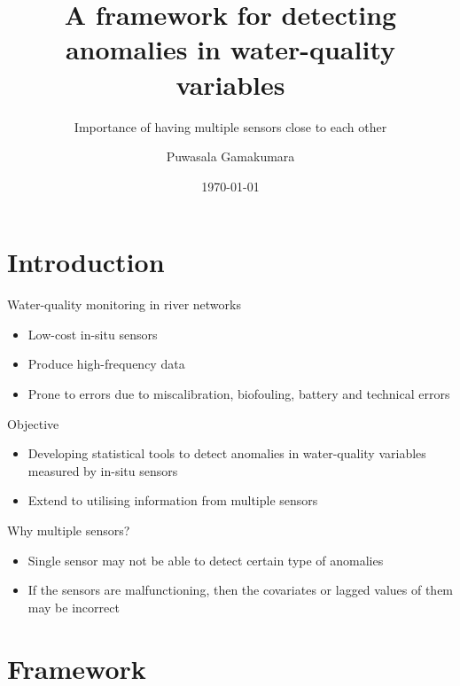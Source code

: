 \documentclass[14pt,ignorenonframetext,compress]{beamer}
\title[]{A framework for detecting anomalies in water-quality
variables}
\subtitle{Importance of having multiple sensors close to each other}
\author[
        Puwasala Gamakumara
    ]{Puwasala Gamakumara}
\date[
      \today
  ]{
      \today
        }
\providecommand{\tightlist}{%
  \setlength{\itemsep}{0pt}\setlength{\parskip}{0pt}}
\begin{document}
  \begin{frame}[plain]
  \titlepage
  \end{frame}



\hypertarget{introduction}{%
\section{Introduction}\label{introduction}}

\begin{frame}{Water-quality monitoring in river networks}
\protect\hypertarget{water-quality-monitoring-in-river-networks}{}
\begin{itemize}
\item
  Low-cost in-situ sensors
\item
  Produce high-frequency data
\item
  Prone to errors due to miscalibration, biofouling, battery and
  technical errors
\end{itemize}

\begin{block}{Objective}
\protect\hypertarget{objective}{}
\begin{itemize}
\tightlist
\item
  Developing statistical tools to detect anomalies in water-quality
  variables measured by in-situ sensors
\item
  Extend to utilising information from multiple sensors
\end{itemize}
\end{block}
\end{frame}

\begin{frame}{Why multiple sensors?}
\protect\hypertarget{why-multiple-sensors}{}
\begin{itemize}
\tightlist
\item
  Single sensor may not be able to detect certain type of anomalies
\item
  If the sensors are malfunctioning, then the covariates or lagged
  values of them may be incorrect
\end{itemize}
\end{frame}

\hypertarget{framework}{%
\section{Framework}\label{framework}}
\end{document}
